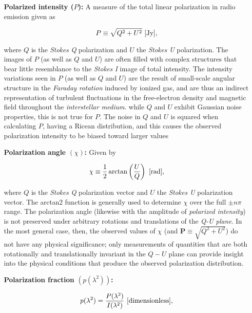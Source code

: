 \documentclass[a4paper,10pt]{article}
\begin{document}
{\noindent}\textbf{Polarized intensity ($P$):} A measure of the total linear polarization in radio emission given as

\begin{align*}
    P\equiv\sqrt{Q^2+U^2} ~ [{\rm Jy}],
\end{align*}

{\noindent}where $Q$ is the \textit{Stokes Q} polarization and $U$ the \textit{Stokes U} polarization. The images of $P$ (as well as $Q$ and $U$) are often filled with complex structures that bear little resemblance to the \textit{Stokes I} image of total intensity. The intensity variations seen in $P$ (as well as $Q$ and $U$) are the result of small-scale angular structure in the \textit{Faraday rotation} induced by ionized gas, and are thus an indirect representation of turbulent fluctuations in the free-electron density and magnetic field throughout the \textit{interstellar medium}. while $Q$ and $U$ exhibit Gaussian noise properties, this is not true for $P$. The noise in $Q$ and $U$ is squared when calculating $P$, having a Ricean distribution, and this causes the observed polarization intensity to be biased toward larger values

{\noindent}\textbf{Polarization angle $(\chi)$:} Given by

\begin{align*}
    \chi\equiv\frac{1}{2}\arctan\left(\frac{U}{Q}\right) ~ [{\rm rad}],
\end{align*}

{\noindent}where $Q$ is the \textit{Stokes Q} polarization vector and $U$ the \textit{Stokes U} polarization vector. The arctan2 function is generally used to determine $\chi$ over the full $\pm n\pi$ range. The polarization angle (likewise with the amplitude of \textit{polarized intensity}) is not preserved under arbitrary rotations and translations of the \textit{Q-U plane}. In the most general case, then, the observed values of $\chi$ (and $\mathbf{P}\equiv\sqrt{Q^2+U^2}$) do not have any physical significance; only measurements of quantities that are both rotationally and translationally invariant in the $Q-U$ plane can provide insight into the physical conditions that produce the observed polarization distribution.

{\noindent}\textbf{Polarization fraction $(p(\lambda^2))$:}

\begin{align*}
    p(\lambda^2) = \frac{P(\lambda^2)}{I(\lambda^2)} ~ [{\rm dimensionless}],
\end{align*}
\end{document}
